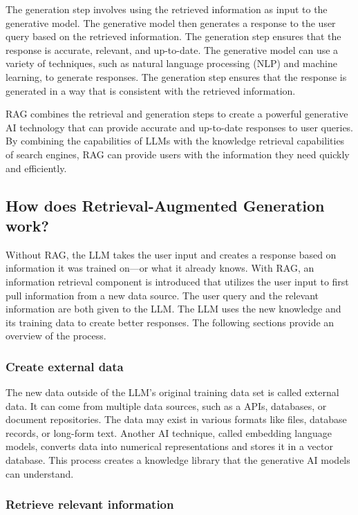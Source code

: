 The generation step involves using the retrieved information as input to the generative model. The 
generative model then generates a response to the user query based on the retrieved information. The 
generation step ensures that the response is accurate, relevant, and up-to-date. The generative model 
can use a variety of techniques, such as natural language processing (NLP) and machine learning, to 
generate responses. The generation step ensures that the response is generated in a way that is consistent 
with the retrieved information.

RAG combines the retrieval and generation steps to create a powerful generative AI technology that 
can provide accurate and up-to-date responses to user queries. By combining the capabilities of LLMs 
with the knowledge retrieval capabilities of search engines, RAG can provide users with the information 
they need quickly and efficiently. 

\subsection{How does Retrieval-Augmented Generation work?}

Without RAG, the LLM takes the user input and creates a response based on information it was trained 
on—or what it already knows. With RAG, an information retrieval component is introduced that utilizes 
the user input to first pull information from a new data source. The user query and the relevant information 
are both given to the LLM. The LLM uses the new knowledge and its training data to create better responses. 
The following sections provide an overview of the process.

\subsubsection{Create external data}

The new data outside of the LLM's original training data set is called external data. It can come from 
multiple data sources, such as a APIs, databases, or document repositories. The data may exist in various 
formats like files, database records, or long-form text. Another AI technique, called embedding language 
models, converts data into numerical representations and stores it in a vector database. This process 
creates a knowledge library that the generative AI models can understand.

\subsubsection{Retrieve relevant information}

